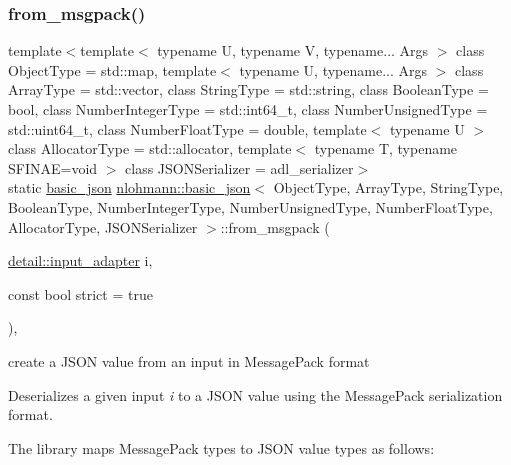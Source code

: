 \subsubsection{\texorpdfstring{from\+\_\+msgpack()}{from\_msgpack()}\hspace{0.1cm}{\footnotesize\ttfamily [1/2]}}
{\footnotesize\ttfamily template$<$template$<$ typename U, typename V, typename... Args $>$ class Object\+Type = std\+::map, template$<$ typename U, typename... Args $>$ class Array\+Type = std\+::vector, class String\+Type  = std\+::string, class Boolean\+Type  = bool, class Number\+Integer\+Type  = std\+::int64\+\_\+t, class Number\+Unsigned\+Type  = std\+::uint64\+\_\+t, class Number\+Float\+Type  = double, template$<$ typename U $>$ class Allocator\+Type = std\+::allocator, template$<$ typename T, typename S\+F\+I\+N\+A\+E=void $>$ class J\+S\+O\+N\+Serializer = adl\+\_\+serializer$>$ \\
static \mbox{\hyperlink{classnlohmann_1_1basic__json}{basic\+\_\+json}} \mbox{\hyperlink{classnlohmann_1_1basic__json}{nlohmann\+::basic\+\_\+json}}$<$ Object\+Type, Array\+Type, String\+Type, Boolean\+Type, Number\+Integer\+Type, Number\+Unsigned\+Type, Number\+Float\+Type, Allocator\+Type, J\+S\+O\+N\+Serializer $>$\+::from\+\_\+msgpack (\begin{DoxyParamCaption}\item[{\mbox{\hyperlink{classnlohmann_1_1detail_1_1input__adapter}{detail\+::input\+\_\+adapter}}}]{i,  }\item[{const bool}]{strict = {\ttfamily true} }\end{DoxyParamCaption})\hspace{0.3cm}{\ttfamily [inline]}, {\ttfamily [static]}}



create a J\+S\+ON value from an input in Message\+Pack format 

Deserializes a given input {\itshape i} to a J\+S\+ON value using the Message\+Pack serialization format.

The library maps Message\+Pack types to J\+S\+ON value types as follows\+:


